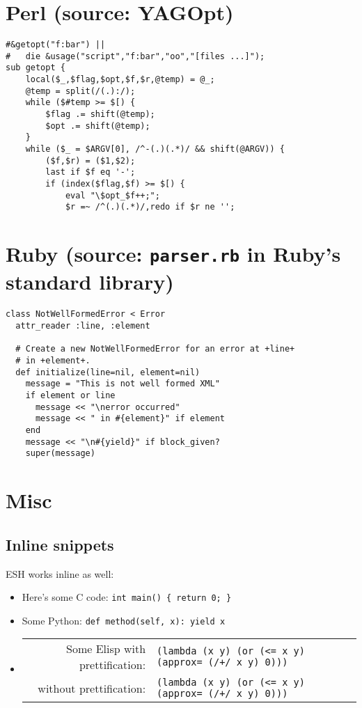 \documentclass{article}
\def\cverb{\verb}
\def\pythonverb{\verb}
\def\prettylisp{\verb}
\def\normallisp{\verb}
\begin{document}
\clearpage

\section*{Perl (source: YAGOpt)}

\begin{verbatim}
#&getopt("f:bar") ||
#	die &usage("script","f:bar","oo","[files ...]");
sub getopt {
    local($_,$flag,$opt,$f,$r,@temp) = @_;
    @temp = split(/(.):/);
    while ($#temp >= $[) {
        $flag .= shift(@temp);
        $opt .= shift(@temp);
    }
    while ($_ = $ARGV[0], /^-(.)(.*)/ && shift(@ARGV)) {
        ($f,$r) = ($1,$2);
        last if $f eq '-';
        if (index($flag,$f) >= $[) {
            eval "\$opt_$f++;";
            $r =~ /^(.)(.*)/,redo if $r ne '';
\end{verbatim}

\section*{Ruby (source: \texttt{parser.rb} in Ruby's standard library)}

\begin{verbatim}
class NotWellFormedError < Error
  attr_reader :line, :element

  # Create a new NotWellFormedError for an error at +line+
  # in +element+.
  def initialize(line=nil, element=nil)
    message = "This is not well formed XML"
    if element or line
      message << "\nerror occurred"
      message << " in #{element}" if element
    end
    message << "\n#{yield}" if block_given?
    super(message)
\end{verbatim}

\section*{Misc}

\subsection*{Inline snippets}

ESH works inline as well:

\begin{itemize}
\item Here's some C code: \cverb|int main() { return 0; }|
\item Some Python: \pythonverb/def method(self, x): yield x/
\item
  \begin{tabular}[t]{@{}r@{ }l}
    Some Elisp with prettification: & \prettylisp,(lambda (x y) (or (<= x y) (approx= (/+/ x y) 0))), \\
            without prettification: & \normallisp!(lambda (x y) (or (<= x y) (approx= (/+/ x y) 0)))!
  \end{tabular}
\end{itemize}
\end{document}
